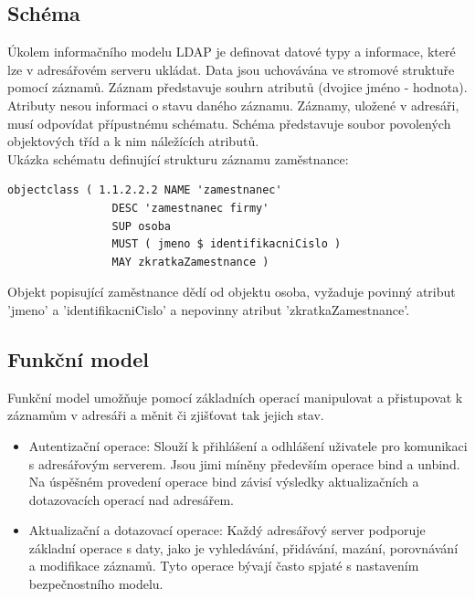 \documentclass{bakalarka}
\begin{document}
\subsection*{Schéma}
Úkolem informačního modelu LDAP je definovat datové typy a informace, které lze v adresářovém serveru ukládat. Data jsou uchovávána ve stromové struktuře pomocí záznamů. Záznam představuje souhrn atributů (dvojice jméno - hodnota). Atributy nesou informaci o stavu daného záznamu. Záznamy, uložené v adresáři, musí odpovídat přípustnému schématu. Schéma  představuje soubor povolených objektových tříd a k nim náležících atributů.\\
Ukázka schématu definující strukturu záznamu zaměstnance:
\begin{verbatim}
objectclass ( 1.1.2.2.2 NAME 'zamestnanec'
                DESC 'zamestnanec firmy'
                SUP osoba
                MUST ( jmeno $ identifikacniCislo )
                MAY zkratkaZamestnance )
\end{verbatim}

Objekt popisující zaměstnance dědí od objektu osoba, vyžaduje povinný atribut 'jmeno' a 'identifikacniCislo' a nepovinny atribut 'zkratkaZamestnance'.

\subsection*{Funkční model}
Funkční model umožňuje pomocí základních operací manipulovat a přistupovat k záznamům v adresáři a měnit či zjišťovat tak jejich stav.
\begin{itemize}[noitemsep,nolistsep]
\item Autentizační operace: Slouží k přihlášení a odhlášení uživatele pro komunikaci s adresářovým serverem. Jsou jimi míněny především operace bind a unbind. Na úspěšném provedení operace bind závisí výsledky aktualizačních a dotazovacích operací nad adresářem.
\item Aktualizační a dotazovací operace: Každý adresářový server podporuje základní operace s daty, jako je vyhledávání, přidávání, mazání, porovnávání a modifikace záznamů. Tyto operace bývají často spjaté s nastavením bezpečnostního modelu.
\end{itemize}
\end{document}
